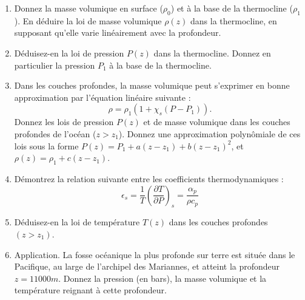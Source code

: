 \begin{enumerate}

\item Donnez la masse volumique en surface ($\rho_0$) et à la base de 
la thermocline ($\rho_1$). En déduire la loi de masse volumique $\rho(z)$  
dans la thermocline, en supposant qu'elle varie linéairement avec la profondeur.

\item  Déduisez-en la loi de pression $P(z)$ dans la thermocline.
Donnez en particulier la pression $P_1$ à la base de la thermocline. 


\item Dans les couches profondes, la masse volumique peut s'exprimer 
en bonne approximation par l'équation linéaire suivante :
$$
\rho = \rho_1 \left( 1 + \chi_s (P-P_1) \right).
$$ 
Donnez les lois de pression $P(z)$  et de masse volumique dans les 
couches profondes de l'océan ($z>z_1$). 
Donnez une approximation polynômiale de ces lois sous la forme
 $P(z) = P_1 + a (z-z_1)+ b (z-z_1)^2$, et $\rho(z) = \rho_1 + c (z-z_1)$.

\item 
Démontrez la relation suivante entre les coefficients thermodynamiques : 
$$
\epsilon_s = \frac{1}{T}
{\left(\frac{\partial T}{\partial  P}\right)}_{s} = \frac{\alpha_p}{\rho c_p}
$$

\item Déduisez-en la loi de température $T(z)$ dans les couches profondes $(z>z_1)$.


\item Application. La fosse océanique la plus profonde sur terre est située dans le 
Pacifique, au large de l'archipel des Mariannes, 
et atteint la profondeur $z=11000 m$. 
Donnez la pression (en bars), la masse volumique et la température 
reignant à cette profondeur.


\end{enumerate}

